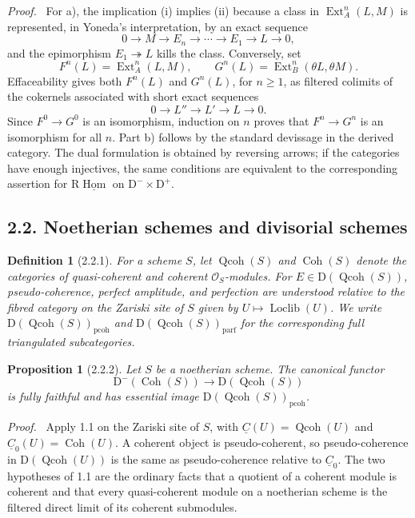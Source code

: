 \documentclass[13pt]{extarticle}
\newcommand{\cO}{\mathcal O}
\newcommand{\uC}{\underline C}
\newcommand{\D}{\mathrm D}
\newcommand{\Qcoh}{\operatorname{Qcoh}}
\newcommand{\Coh}{\operatorname{Coh}}
\newcommand{\Loclib}{\operatorname{Loclib}}
\newcommand{\Ext}{\operatorname{Ext}}
\newcommand{\RHom}{\mathrm R\underline{\operatorname{Hom}}}
\newenvironment{prooftext}[1][Proof]{\par\noindent\emph{#1.}\ }{\par\medskip}
\newtheorem*{proposition*}{Proposition}
\newtheorem*{definition*}{Definition}
\begin{document}
\begin{prooftext}
For a), the implication (i) implies (ii) because a class in $\Ext_A^n(L,M)$ is represented, in Yoneda's interpretation, by an exact sequence
\[
0\to M\to E_n\to\cdots\to E_1\to L\to0,
\]
and the epimorphism $E_1\twoheadrightarrow L$ kills the class. Conversely, set
\[
F^n(L)=\Ext_A^n(L,M),\qquad G^n(L)=\Ext_B^n(\theta L,\theta M).
\]
Effaceability gives both $F^n(L)$ and $G^n(L)$, for $n\ge1$, as filtered colimits of the cokernels associated with short exact sequences
\[
0\to L''\to L'\to L\to0.
\]
Since $F^0\to G^0$ is an isomorphism, induction on $n$ proves that $F^n\to G^n$ is an isomorphism for all $n$. Part b) follows by the standard devissage in the derived category. The dual formulation is obtained by reversing arrows; if the categories have enough injectives, the same conditions are equivalent to the corresponding assertion for $\RHom$ on $\D^-\times\D^+$.
\end{prooftext}

\subsection*{2.2. Noetherian schemes and divisorial schemes}
\begin{definition*}[2.2.1]
For a scheme $S$, let $\Qcoh(S)$ and $\Coh(S)$ denote the categories of quasi-coherent and coherent $\cO_S$-modules. For $E\in\D(\Qcoh(S))$, pseudo-coherence, perfect amplitude, and perfection are understood relative to the fibred category on the Zariski site of $S$ given by $U\mapsto\Loclib(U)$. We write $\D(\Qcoh(S))_{\mathrm{pcoh}}$ and $\D(\Qcoh(S))_{\mathrm{parf}}$ for the corresponding full triangulated subcategories.
\end{definition*}

\begin{proposition*}[2.2.2]
Let $S$ be a noetherian scheme. The canonical functor
\[
\D^-(\Coh(S))\longrightarrow \D(\Qcoh(S))
\]
is fully faithful and has essential image $\D(\Qcoh(S))_{\mathrm{pcoh}}$.
\end{proposition*}

\begin{prooftext}
Apply 1.1 on the Zariski site of $S$, with $\uC(U)=\Qcoh(U)$ and $\uC_0(U)=\Coh(U)$. A coherent object is pseudo-coherent, so pseudo-coherence in $\D(\Qcoh(U))$ is the same as pseudo-coherence relative to $\uC_0$. The two hypotheses of 1.1 are the ordinary facts that a quotient of a coherent module is coherent and that every quasi-coherent module on a noetherian scheme is the filtered direct limit of its coherent submodules.
\end{prooftext}
\end{document}
